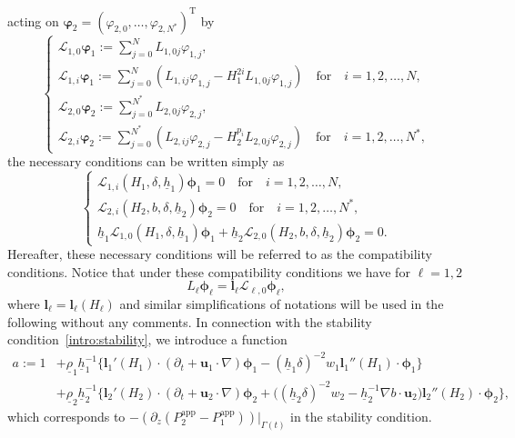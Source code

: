 \documentclass[11pt,leqno]{article}
\numberwithin{equation}{section}
\numberwithin{figure}{section}
\begin{document}
acting on ${\bm \varphi}_2 = (\varphi_{2,0},\ldots,\varphi_{2,N^*})^\mathrm{T}$ by 
%
\begin{equation}\label{def-calL}
\begin{cases}
 \displaystyle
  \mathcal{L}_{1,0} {\bm \varphi}_1 
   := \sum_{j=0}^{N} L_{1,0j}\varphi_{1,j}, \\
 \displaystyle
  \mathcal{L}_{1,i} {\bm \varphi}_1
   := \sum_{j=0}^N ( L_{1,ij}\varphi_{1,j} - H_1^{2i}L_{1,0j}\varphi_{1,j} )
   \quad\mbox{for}\quad i=1,2,\ldots,N, \\
 \displaystyle
  \mathcal{L}_{2,0} {\bm \varphi}_2 
   := \sum_{j=0}^{N^*} L_{2,0j}\varphi_{2,j}, \\
 \displaystyle
  \mathcal{L}_{2,i} {\bm \varphi}_2
  := \sum_{j=0}^{N^*} ( L_{2,ij}\varphi_{2,j} - H_2^{p_i}L_{2,0j}\varphi_{2,j} )
   \quad\mbox{for}\quad i=1,2,\ldots,N^*, 
\end{cases}
\end{equation}
%
the necessary conditions can be written simply as 
%
\begin{equation}\label{necessary-delta}
\begin{cases}
 \mathcal{L}_{1,i}(H_1,\delta,\underline{h}_1) {\bm \phi}_1 = 0 \quad\mbox{for}\quad i=1,2,\ldots,N, \\
 \mathcal{L}_{2,i}(H_2,b,\delta,\underline{h}_2) {\bm \phi}_2 = 0 \quad\mbox{for}\quad i=1,2,\ldots,N^*, \\
 \underline{h}_1\mathcal{L}_{1,0}(H_1,\delta,\underline{h}_1) {\bm \phi}_1
  + \underline{h}_2\mathcal{L}_{2,0}(H_2,b,\delta,\underline{h}_2) {\bm \phi}_2  = 0.
\end{cases}
\end{equation}
%
Hereafter, these necessary conditions will be referred to as the compatibility conditions. 
Notice that under these compatibility conditions we have for $\ell=1,2$
%
\begin{equation}\label{expression-L_k}
L_\ell\bm{\phi}_\ell = \bm{l}_\ell\mathcal{L}_{\ell,0}\bm{\phi}_\ell,
\end{equation}
%
where $\bm{l}_\ell=\bm{l}_\ell(H_\ell)$ and similar simplifications of notations will be used in the following 
without any comments. 
In connection with the stability condition~\eqref{intro:stability}, we introduce a function 
%
\begin{align}\label{def-a}
a := 1 &+ \underline{\rho}_1\underline{h}_1^{-1}\{ \bm{l}_1'(H_1)\cdot(\partial_t+\bm{u}_1\cdot\nabla)\bm{\phi}_1
  - (\underline{h}_1\delta)^{-2}w_1\bm{l}_1''(H_1)\cdot\bm{\phi}_1 \} \\
&
 + \underline{\rho}_2\underline{h}_2^{-1}\{ \bm{l}_2'(H_2)\cdot(\partial_t+\bm{u}_2\cdot\nabla)\bm{\phi}_2
  + \bigl( (\underline{h}_2\delta)^{-2}w_2 - \underline{h}_2^{-1}\nabla b\cdot\bm{u}_2\bigr)\bm{l}_2''(H_2)\cdot\bm{\phi}_2 \},
 \nonumber
\end{align}
%
which corresponds to $- (\partial_z (P_2^\mathrm{app} - P_1^\mathrm{app} ))|_{\Gamma(t)}$ in the stability condition.
\end{document}
